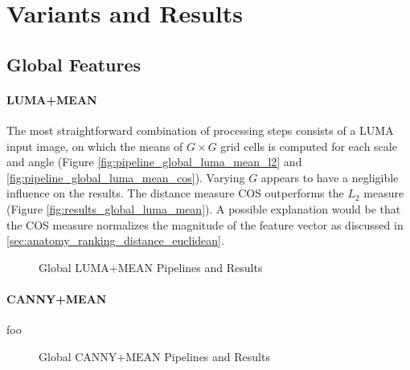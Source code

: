 \section{Variants and Results}\label{sec:results}

\subsection{Global Features}

\paragraph{LUMA+MEAN}

The most straightforward combination of processing steps consists of a LUMA
input image, on which the means of $G \times G$ grid cells is computed for each
scale and angle (Figure \ref{fig:pipeline_global_luma_mean_l2} and
\ref{fig:pipeline_global_luma_mean_cos}). Varying $G$ appears to have a
negligible influence on the results. The distance measure COS outperforms the
$L_2$ measure (Figure \ref{fig:results_global_luma_mean}). A possible
explanation would be that the COS measure normalizes the magnitude of the
feature vector as discussed in \ref{sec:anatomy_ranking_distance_euclidean}.

\begin{figure}[h]
    \centering
    \quad
    \quad
    \caption[Global LUMA+MEAN Pipelines and Results]{
        Global LUMA+MEAN Pipelines and Results
    }
    \label{fig:pipeline_global_luma_mean}
\end{figure}

\paragraph{CANNY+MEAN}

foo

\begin{figure}[h]
    \centering
    \quad
    \quad
    \caption[Global CANNY+MEAN Pipelines and Results]{
        Global CANNY+MEAN Pipelines and Results
    }
    \label{fig:pipeline_global_luma_canny_mean}
\end{figure}

